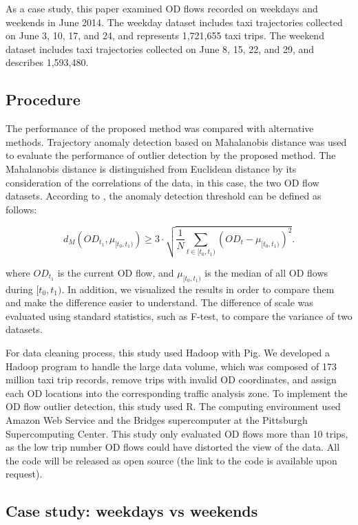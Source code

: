 \documentclass[a4paper,UKenglish]{lipics-v2018}
\begin{document}
As a case study, this paper examined OD flows recorded on weekdays and weekends in June 2014.
The weekday dataset includes taxi trajectories collected on June 3, 10, 17, and 24, and represents 1,721,655 taxi trips.
The weekend dataset includes taxi trajectories collected on June 8, 15, 22, and 29, and describes 1,593,480. 

\subsection{Procedure}

The performance of the proposed method was compared with alternative methods.
Trajectory anomaly detection based on Mahalanobis distance \cite{pan13ACMGIS} was used to evaluate the performance of outlier detection by the proposed method.
The Mahalanobis distance is distinguished from Euclidean distance by its consideration of the correlations of the data, in this case, the two OD flow datasets. 
According to \cite{pan13ACMGIS}, the anomaly detection threshold can be defined as follows:

\begin{equation*}
d_M(OD_{t_1}, \mu_{[t_0,t_1)}) \geq 3\cdot \sqrt{\frac{1}{N}\sum_{t \in [t_0,t_1)} (OD_{t} - \mu_{[t_0,t_1)})^2} .
\end{equation*}

where $OD_{t_1}$ is the current OD flow, and $\mu_{[t_0,t_1)}$ is the median of all OD flows during $[t_0,t_1)$.
In addition, we visualized the results in order to compare them and make the difference easier to understand.
The difference of scale was evaluated using standard statistics, such as F-test, to compare the variance of two datasets. 

For data cleaning process, this study used Hadoop with Pig.
We developed a Hadoop program to handle the large data volume, which was composed of 173 million taxi trip records, remove trips with invalid OD coordinates, and assign each OD locations into the corresponding traffic analysis zone.
To implement the OD flow outlier detection, this study used R.
The computing environment used Amazon Web Service and the Bridges supercomputer at the Pittsburgh Supercomputing Center. 
This study only evaluated OD flows more than 10 trips, as the low trip number OD flows could have distorted the view of the data.
All the code will be released as open source (the link to the code is available upon request).


\subsection{Case study: weekdays vs weekends}
\end{document}
